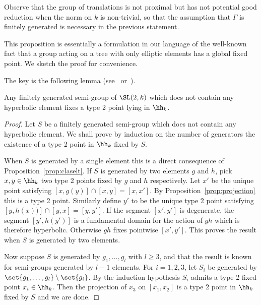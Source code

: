 Observe that the group of translations is not proximal but has not potential good reduction when the norm on $k$ is non-trivial, so that the assumption that $\Gamma$ is finitely generated is necessary in the previous statement.


This proposition is essentially a formulation in our language of the well-known fact that a group acting on a tree with only elliptic elements has a global fixed point. We sketch the proof for convenience.

The key is the following lemma (see~\cite[Lem.~10.4]{kapovich} or~\cite[Lem.~40]{otal}).

\begin{lemm}\label{lem:semi group}
Any finitely generated semi-group of $\SL(2,k)$ which does not contain any hyperbolic element fixes a type 2 point lying in $\hh_k$.
\end{lemm}

\begin{proof}
Let $S$ be a finitely generated semi-group which does not contain any hyperbolic element. We shall prove by induction on the number of generators the existence of a type 2 point in $\hh_k$ fixed by $S$.

When $S$ is generated by a single element this is a direct consequence of Proposition~\ref{prop:claselt}. If $S$ is generated by two elements $g$ and $h$, pick $x,y\in \hh_k$ two type 2 points fixed by $g$ and $h$ respectively. Let $x'$ be the unique point satisfying $[x,g(y)] \cap [x,y] = [x,x']$. By Proposition~\ref{prop:projection} this is a type 2 point. Similarly define $y'$ to be the unique type 2 point satisfying $[y,h(x))] \cap [y,x] = [y,y']$. If the segment $[x',y']$ is degenerate, the segment $[y',h(y')]$ is a fundamental domain for the action of $gh$ which is therefore hyperbolic. Otherwise $gh$ fixes pointwise $[x',y']$. This proves the result when $S$ is generated by two elements.

Now suppose $S$ is generated by $g_1, \ldots, g_l$ with $l\ge 3$, and that the result is known for semi-groups generated by $l-1$ elements. For $i =1,2,3$, let $S_i$ be generated by $\set{ g_1, \ldots, g_l}\setminus \set{g_i}$. By the induction hypothesis $S_i$ admits a type 2 fixed point $x_i \in \hh_k$. Then the projection of $x_3$ on $[x_1, x_2]$ is a type 2 point in $\hh_k$ fixed by $S$ and we are done.
\end{proof}



